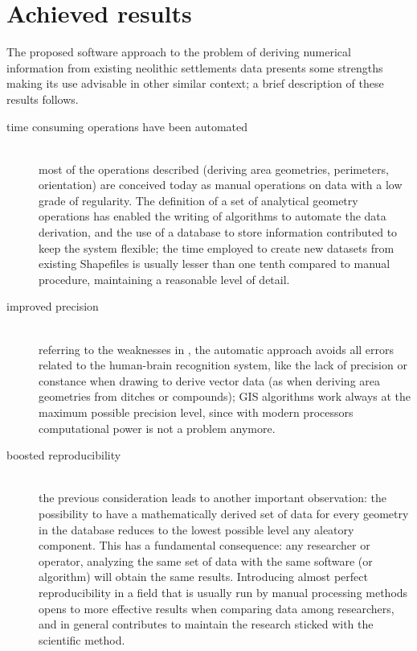             \vfill

        \section{Achieved results}
            The proposed software approach to the problem of deriving numerical information from existing neolithic settlements data presents some strengths making its use advisable in other similar context; a brief description of these results follows.

            \begin{description}
                \item[time consuming operations have been automated]\hfill\\most of the operations described (deriving area geometries, perimeters, orientation) are conceived today as manual operations on data with a low grade of regularity. The definition of a set of analytical geometry operations has enabled the writing of algorithms to automate the data derivation, and the use of a database to store information contributed to keep the system flexible; the time employed to create new datasets from existing Shapefiles is usually lesser than one tenth compared to manual procedure, maintaining a reasonable level of detail.
                \item[improved precision]\hfill\\referring to the weaknesses in , the automatic approach avoids all errors related to the human-brain recognition system, like the lack of precision or constance when drawing to derive vector data (as when deriving area geometries from ditches or compounds); GIS algorithms work always at the maximum possible precision level, since with modern processors computational power is not a problem anymore.
                \item[boosted reproducibility]\hfill\\the previous consideration leads to another important observation: the possibility to have a mathematically derived set of data for every geometry in the database reduces to the lowest possible level any aleatory component. This has a fundamental consequence: any researcher or operator, analyzing the same set of data with the same software (or algorithm) will obtain the same results. Introducing almost perfect reproducibility in a field that is usually run by manual processing methods opens to more effective results when comparing data among researchers, and in general contributes to maintain the research sticked with the scientific method.

\end{description}
